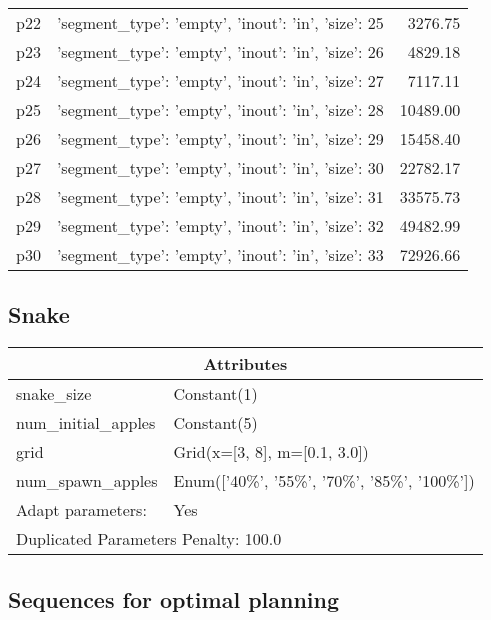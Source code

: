 \documentclass{article}
\begin{document}
\begin{center}
\begin{tabular}{@{}l|r|r@{}}
  p22&{'segment\_type': 'empty', 'inout': 'in', 'size': 25}&3276.75\\
  p23&{'segment\_type': 'empty', 'inout': 'in', 'size': 26}&4829.18\\
  p24&{'segment\_type': 'empty', 'inout': 'in', 'size': 27}&7117.11\\
  p25&{'segment\_type': 'empty', 'inout': 'in', 'size': 28}&10489.00\\
  p26&{'segment\_type': 'empty', 'inout': 'in', 'size': 29}&15458.40\\
  p27&{'segment\_type': 'empty', 'inout': 'in', 'size': 30}&22782.17\\
  p28&{'segment\_type': 'empty', 'inout': 'in', 'size': 31}&33575.73\\
  p29&{'segment\_type': 'empty', 'inout': 'in', 'size': 32}&49482.99\\
  p30&{'segment\_type': 'empty', 'inout': 'in', 'size': 33}&72926.66
                            \end{tabular}
                            \end{center}
                    
                            \newpage \subsection{Snake}
                    \begin{center}
                    \begin{tabular}{@{}p{}p{}@{}}
                    \multicolumn{2}{c}{\bf \large Attributes}\\\midrule
                    snake\_size & Constant(1)\\
num\_initial\_apples & Constant(5)\\
grid & Grid(x=[3, 8], m=[0.1, 3.0])\\
num\_spawn\_apples & Enum(['40\%', '55\%', '70\%', '85\%', '100\%'])
                    \\\midrule
                    Adapt parameters: & Yes \\\midrule
                    \multicolumn{2}{l}{Duplicated Parameters Penalty: 100.0}
                    \end{tabular}
                    \end{center}
                
                            \subsection*{Sequences for optimal planning}
\end{document}
